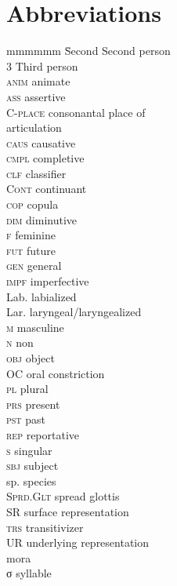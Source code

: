 \documentclass[output=paper]{langscibook}
\begin{document}
\section*{Abbreviations}
\begin{multicols}{2}
\begin{tabbing}
mmmmmm \= Second   \>  Second person\\
3  \>  Third person\\
\textsc{anim}  \>  animate\\
\textsc{ass}  \>  assertive\\
\textsc{C-place}  \>  consonantal place of \\ \> articulation\\
\textsc{caus}  \>  causative\\
\textsc{cmpl}  \>  completive\\
\textsc{clf}  \>  classifier\\
\textsc{Cont}  \>  continuant\\
\textsc{cop}  \>  copula\\
\textsc{dim}  \>  diminutive\\
\textsc{f}  \>  feminine\\
\textsc{fut}  \>  future\\
\textsc{gen}  \>  general\\
\textsc{impf}  \>  imperfective\\
Lab.  \>  labialized \\
Lar.  \>  laryngeal/laryngealized\\
\textsc{m}  \>  masculine \\
\textsc{n}  \>  non\\
\textsc{obj}  \>  object\\
OC   \>    oral constriction \\
\textsc{pl}  \>  plural \\
\textsc{prs}  \>  present\\
\textsc{pst}  \>  past\\
\textsc{rep}  \>  reportative\\
\textsc{s}  \>  singular\\
\textsc{sbj}  \>  subject\\
sp. \>  species \\
\textsc{Sprd.Glt}  \>  spread glottis\\
SR   \>    surface representation \\
\textsc{trs}  \>  transitivizer\\
UR   \>  underlying representation \\
\textmu  \>  mora \\
σ  \>  syllable
\end{tabbing}
\end{multicols}
\end{document}
